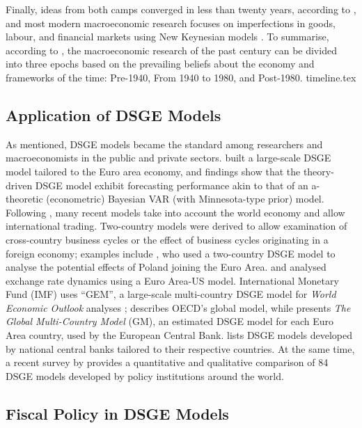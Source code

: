 Finally, ideas from both camps converged in less than twenty years, according to \textcite[1388]{blanchard_2000_what}, and most modern macroeconomic research focuses on imperfections in goods, labour, and financial markets using New Keynesian models \parencite{jordigal_2015_monetary}. To summarise, according to \textcite{blanchard_2000_what}, the macroeconomic research of the past century can be divided into three epochs based on the prevailing beliefs about the economy and frameworks of the time: Pre-1940, From 1940 to 1980, and Post-1980.
{timeline.tex}

\subsection{Application of DSGE Models}
As mentioned, DSGE models became the standard among researchers and macroeconomists in the public and private sectors. \textcite{smets_2003_an} built a large-scale DSGE model tailored to the Euro area economy, and \textcite[595]{smets_2007_shocks} findings show that the theory-driven DSGE model exhibit forecasting performance akin to that of an a-theoretic (econometric) Bayesian VAR (with Minnesota-type prior) model. Following \textcite{adolfson_2007_bayesian}, many recent models take into account the world economy and allow international trading. Two-country models were derived to allow examination of cross-country business cycles or the effect of business cycles originating in a foreign economy; examples include \textcite{kolasa_2009_structural}, who used a two-country DSGE model to analyse the potential effects of Poland joining the Euro Area. \textcite{gregorydewalque_2017_an} and \textcite{gunter_2017_estimating} analysed exchange rate dynamics using a Euro Area-US model. International Monetary Fund (IMF) uses ``GEM'', a large-scale multi-country DSGE model for \textit{World Economic Outlook} analyses \parencite{mrivantchakarov_2004_gem}; \textcite{herv_2011_the} describes OECD's global model, while \textcite{albonico_2019_the} presents \textit{The Global Multi-Country Model} (GM), an estimated DSGE model for each Euro Area country, used by the European Central Bank. \citereset\textcite[3]{albonico_2019_the} lists DSGE models developed by national central banks tailored to their respective countries. At the same time, a recent survey by \textcite{yagihashi_2020_dsge} provides a quantitative and qualitative comparison of 84 DSGE models developed by policy institutions around the world.

\subsection{Fiscal Policy in DSGE Models}

